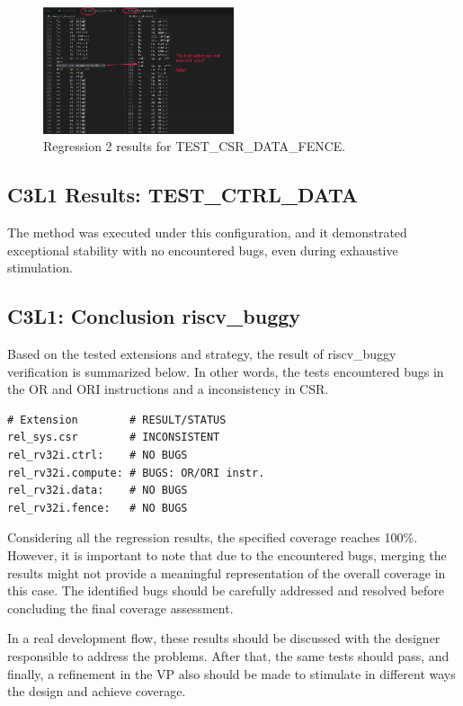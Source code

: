 \begin{figure}[H]
    \centering
    \includegraphics[width=0.5\textwidth]{./c3l1_img/tcdf_reg2.png}
    \caption{Regression 2 results for TEST\_CSR\_DATA\_FENCE.}
    \label{fig:tcdf_reg2}
\end{figure}

\subsection{C3L1 Results: TEST\_CTRL\_DATA}

The method was executed under this configuration, and it demonstrated exceptional stability with no encountered bugs, even during exhaustive stimulation.

\subsection{C3L1: Conclusion riscv\_buggy}

Based on the tested extensions and strategy, the result of riscv\_buggy verification is summarized below. In other words, the tests encountered bugs in the OR and ORI instructions and a inconsistency in CSR.

\begin{verbatim}
# Extension        # RESULT/STATUS
rel_sys.csr        # INCONSISTENT
rel_rv32i.ctrl:    # NO BUGS
rel_rv32i.compute: # BUGS: OR/ORI instr.
rel_rv32i.data:    # NO BUGS
rel_rv32i.fence:   # NO BUGS
\end{verbatim}

Considering all the regression results, the specified coverage reaches 100\%. However, it is important to note that due to the encountered bugs, merging the results might not provide a meaningful representation of the overall coverage in this case. The identified bugs should be carefully addressed and resolved before concluding the final coverage assessment.

In a real development flow, these results should be discussed with the designer responsible to address the problems. After that, the same tests should pass, and finally, a refinement in the VP also should be made to stimulate in different ways the design and achieve coverage.